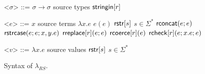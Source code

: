 \documentclass[9pt]{sig-alternate}
\theoremstyle{definition}
\newcommand{\sisubst}[3]{{\sf rreplace}[#1](#2;#3)} \newcommand{\rreplace}[3]{{\sf rreplace}[#1](#2;#3)} %
\newcommand{\rcoerce}[2]{{\sf rcoerce}[#1](#2)}
\newcommand{\sistr}[1]{{\sf rstr}[#1]}   \newcommand{\rstr}[1]{{\sf rstr}[#1]} %
\newcommand{\rcheck}[4]{ {\sf rcheck}[#1](#2;#3;#4) }
\newcommand{\strin}[1]{\sistr{#1}}
\newcommand{\rsconcat}[2]{{\sf rconcat}(#1;#2)} \newcommand{\rconcat}[2]{{\sf rconcat}(#1;#2)} %
\newcommand{\stringin}[1]{{\sf stringin}[#1]}
\newcommand{\strcase}[3]{ {\sf rstrcase}(#1; #2; #3)}
\begin{document}
\begin{figure}[h]
\begin{grammar}

<$\sigma$> ::=  $\sigma \rightarrow \sigma$     \hfill  source types          \alt
$\stringin{r}$         

<$e$> ::= 
      $x$ \hfill source terms \alt 
      $\lambda x . e$ \alt
      $e(e)$ \alt
      $\strin{s}$ \hfill $s \in \Sigma^{*}$ \alt
      $\rsconcat{e}{e}$ \alt
      $\strcase{e}{e}{x,y.e}$ \alt
      $\sisubst{r}{e}{e}$ \alt
      $\rcoerce{r}{e}$ \alt
      $\rcheck{r}{e}{x.e}{e}$

<$v$> ::= $\lambda x . e$ \hfill source values \alt
          $\strin{s}$ \hfill $s \in \Sigma^{*}$


      
\caption{Syntax of $\lambda_{RS}$.}
\label{fig:glambdas}
\end{grammar}
\end{figure}
\end{document}
